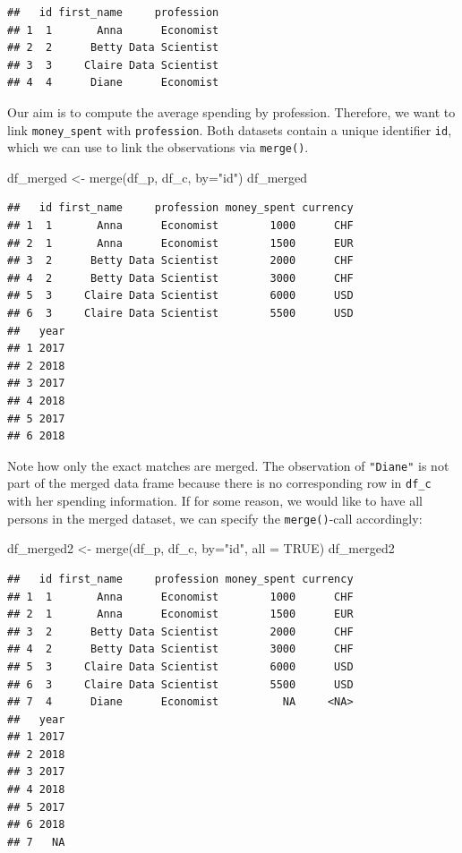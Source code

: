 \documentclass[
  12pt,
]{style/krantz}
\newenvironment{Shaded}{\begin{snugshade}}{\end{snugshade}}
\newcommand{\AttributeTok}[1]{\textcolor[rgb]{0.77,0.63,0.00}{#1}}
\newcommand{\ConstantTok}[1]{\textcolor[rgb]{0.00,0.00,0.00}{#1}}
\newcommand{\FunctionTok}[1]{\textcolor[rgb]{0.00,0.00,0.00}{#1}}
\newcommand{\NormalTok}[1]{#1}
\newcommand{\OtherTok}[1]{\textcolor[rgb]{0.56,0.35,0.01}{#1}}
\newcommand{\StringTok}[1]{\textcolor[rgb]{0.31,0.60,0.02}{#1}}
\begin{document}
\begin{verbatim}
##   id first_name     profession
## 1  1       Anna      Economist
## 2  2      Betty Data Scientist
## 3  3     Claire Data Scientist
## 4  4      Diane      Economist
\end{verbatim}

Our aim is to compute the average spending by profession. Therefore, we want to link \texttt{money\_spent} with \texttt{profession}. Both datasets contain a unique identifier \texttt{id}, which we can use to link the observations via \texttt{merge()}.

\begin{Shaded}
\begin{Highlighting}[]
\NormalTok{df\_merged }\OtherTok{\textless{}{-}} \FunctionTok{merge}\NormalTok{(df\_p, df\_c, }\AttributeTok{by=}\StringTok{"id"}\NormalTok{)}
\NormalTok{df\_merged}
\end{Highlighting}
\end{Shaded}

\begin{verbatim}
##   id first_name     profession money_spent currency
## 1  1       Anna      Economist        1000      CHF
## 2  1       Anna      Economist        1500      EUR
## 3  2      Betty Data Scientist        2000      CHF
## 4  2      Betty Data Scientist        3000      CHF
## 5  3     Claire Data Scientist        6000      USD
## 6  3     Claire Data Scientist        5500      USD
##   year
## 1 2017
## 2 2018
## 3 2017
## 4 2018
## 5 2017
## 6 2018
\end{verbatim}

Note how only the exact matches are merged. The observation of \texttt{"Diane"} is not part of the merged data frame because there is no corresponding row in \texttt{df\_c} with her spending information. If for some reason, we would like to have all persons in the merged dataset, we can specify the \texttt{merge()}-call accordingly:

\begin{Shaded}
\begin{Highlighting}[]
\NormalTok{df\_merged2 }\OtherTok{\textless{}{-}} \FunctionTok{merge}\NormalTok{(df\_p, df\_c, }\AttributeTok{by=}\StringTok{"id"}\NormalTok{, }\AttributeTok{all =} \ConstantTok{TRUE}\NormalTok{)}
\NormalTok{df\_merged2}
\end{Highlighting}
\end{Shaded}

\begin{verbatim}
##   id first_name     profession money_spent currency
## 1  1       Anna      Economist        1000      CHF
## 2  1       Anna      Economist        1500      EUR
## 3  2      Betty Data Scientist        2000      CHF
## 4  2      Betty Data Scientist        3000      CHF
## 5  3     Claire Data Scientist        6000      USD
## 6  3     Claire Data Scientist        5500      USD
## 7  4      Diane      Economist          NA     <NA>
##   year
## 1 2017
## 2 2018
## 3 2017
## 4 2018
## 5 2017
## 6 2018
## 7   NA
\end{verbatim}
\end{document}
